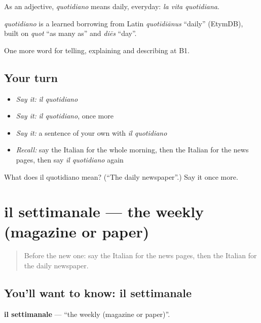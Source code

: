 As an adjective, \emph{quotidiano} means daily, everyday: \emph{la vita quotidiana}.

\begin{cousinweb}
\emph{quotidiano} is a learned borrowing from Latin \emph{quotīdiānus} \textquotedblleft{}daily\textquotedblright{} (EtymDB), built on \emph{quot} \textquotedblleft{}as many as\textquotedblright{} and \emph{diēs} \textquotedblleft{}day\textquotedblright{}.
\end{cousinweb}

\begin{grammarlens}[title={What you've built}]
One more word for telling, explaining and describing at B1.
\end{grammarlens}

\subsection*{Your turn}
\begin{itemize}
\raggedright
  \item \emph{Say it:} \emph{il quotidiano}
  \item \emph{Say it:} \emph{il quotidiano}, once more
  \item \emph{Say it:} a sentence of your own with \emph{il quotidiano}
  \item \emph{Recall:} say the Italian for the whole morning, then the Italian for the news pages, then say \emph{il quotidiano} again
\end{itemize}

\begin{tcolorbox}[breakable,colback=teal!4,colframe=teal!35!black,title={Before you move on}]
What does il quotidiano mean? (\textquotedblleft{}The daily newspaper\textquotedblright{}.) Say it once more.
\end{tcolorbox}
\section[il settimanale]{il settimanale — the weekly (magazine or paper)}

\label{lesson:IT-C282-settimanale}



\begin{quote}
Before the new one: say the Italian for the news pages, then the Italian for the daily newspaper.
\end{quote}

\subsection*{You'll want to know: il settimanale}
\textbf{il settimanale} — \textquotedblleft{}the weekly (magazine or paper)\textquotedblright{}.

